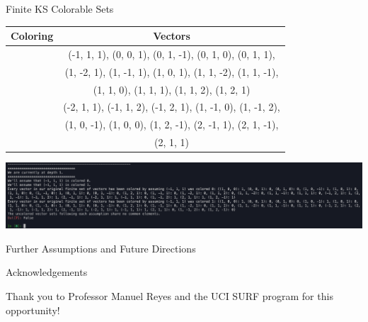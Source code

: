 \documentclass[11pt]{beamer}
\begin{document}
\begin{frame}{Finite KS Colorable Sets}

\begin{center}
	\begin{tabular}{| c | c |} 
		\hline
		Coloring & Vectors \\
		\hline
		\begingroup\color{blue}{0}\endgroup 
		& (-1, 1, 1), (0, 0, 1), (0, 1, -1), (0, 1, 0), (0, 1, 1), \\
		& (1, -2, 1), (1, -1, 1), (1, 0, 1), (1, 1, -2), (1, 1, -1), \\
		& (1, 1, 0), (1, 1, 1), (1, 1, 2), (1, 2, 1) \\
		\hline
		\begingroup\color{red}{1}\endgroup 
		& (-2, 1, 1), (-1, 1, 2), (-1, 2, 1), (1, -1, 0), (1, -1, 2), \\
		& (1, 0, -1), (1, 0, 0), (1, 2, -1), (2, -1, 1), (2, 1, -1), \\
		& (2, 1, 1) \\
		\hline
	\end{tabular}
	
	\vfill
	\pause
	
	\includegraphics[width=\textwidth]{Finite KS Colorable Set}
	
\end{center}

\end{frame}
\begin{frame}{Further Assumptions and Future Directions}

\centering


\end{frame}

\begin{frame}{Acknowledgements}

	\centering
	
	\Large{Thank you to Professor Manuel Reyes and the UCI SURF program for this opportunity!}
	
\end{frame}
\end{document}
